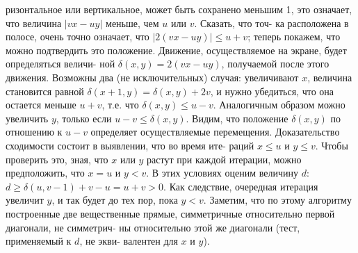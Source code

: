 \documentclass{mai_book}
\begin{document}
ризонтальное или вертикальное, может быть сохранено меньшим 1, это
означает, что величина $|vx-uy|$ меньше, чем $u$ или $v$. Сказать, что точ-
ка расположена в полосе, очень точно означает, что $|2(vx-uy)|\leq u+v$;
теперь покажем, что можно подтвердить это положение.\newline
\hspace*{15pt}Движение, осуществляемое на экране, будет определяться величи-\newline
ной $\delta(x,y)=2(vx-uy)$, получаемой после этого движения. Возможны
два (не исключительных) случая: увеличивают $x$, величина становится
равной $\delta(x+1,y)=\delta(x,y)+2v$, и нужно убедиться, что она остается
меньше $u+v$, т.е. что $\delta(x,y)\leq u-v$. Аналогичным образом можно
увеличить $y$, только если $u-v\leq\delta(x,y)$. Видим, что положение $\delta(x,y)$
по отношению к $u-v$ определяет осуществляемые перемещения.\newline
\hspace*{15pt}Доказательство сходимости состоит в выявлении, что во время ите-
раций $x\leq u$ и $y\leq v$. Чтобы проверить это, зная, что $x$ или $y$ растут
при каждой итерации, можно предположить, что $x=u$ и $y<v$. В
этих условиях оценим величину $d$: $d\geq\delta(u,v-1)+v-u=u+v>0$.
Как следствие, очередная итерация увеличит $y$, и так будет до тех пор,
пока $y<v$.\newline
\hspace*{15pt}Заметим, что по этому алгоритму построенные две вещественные
прямые, симметричные относительно первой диагонали, не симметрич-
ны относительно этой же диагонали (тест, применяемый к $d$, не экви-
валентен для $x$ и $y$).\newline
\end{document}
